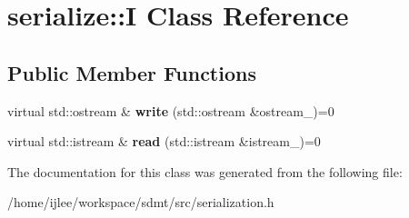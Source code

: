 \hypertarget{classserialize_1_1_i}{}\section{serialize\+:\+:I Class Reference}
\label{classserialize_1_1_i}
\subsection*{Public Member Functions}
\begin{DoxyCompactItemize}
\item 
\mbox{\label{classserialize_1_1_i_abc3fd75ac917315136e2d5eab93d763f}} 
virtual std\+::ostream \& {\bfseries write} (std\+::ostream \&ostream\+\_\+)=0
\item 
\mbox{\label{classserialize_1_1_i_a71cbf8644417e190a1cd28227dd9a9e8}} 
virtual std\+::istream \& {\bfseries read} (std\+::istream \&istream\+\_\+)=0
\end{DoxyCompactItemize}


The documentation for this class was generated from the following file\+:\begin{DoxyCompactItemize}
\item 
/home/ijlee/workspace/sdmt/src/serialization.\+h\end{DoxyCompactItemize}
